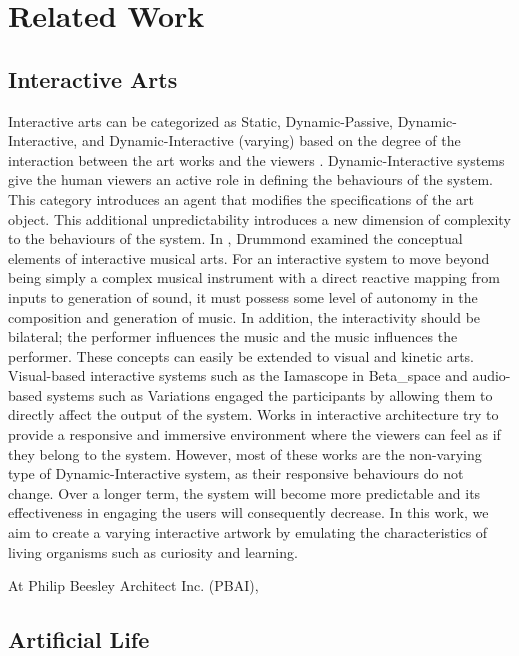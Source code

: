 \chapter{Related Work} \label{chap:related_work}

\section{Interactive Arts}
Interactive arts can be categorized as Static, Dynamic-Passive, Dynamic-Interactive, and Dynamic-Interactive (varying) based on the degree of the interaction between the art works and the viewers \cite{Edmonds2004}. Dynamic-Interactive systems give the human viewers an active role in defining the behaviours of the system. This category introduces an agent that modifies the specifications of the art object. This additional unpredictability introduces a new dimension of complexity to the behaviours of the system. 
In \cite{Drummond2009}, Drummond examined the conceptual elements of interactive musical arts. For an interactive system to move beyond being simply a complex musical instrument with a direct reactive mapping from inputs to generation of sound, it must possess some level of autonomy in the composition and generation of music. In addition, the interactivity should be bilateral; the performer influences the music and the music influences the performer. These concepts can easily be extended to visual and kinetic arts. Visual-based interactive systems such as the Iamascope in Beta\_space \cite{Costello2005} and audio-based systems such as Variations \cite{Wands2005} engaged the participants by allowing them to directly affect the output of the system. Works in interactive architecture \cite{Beesley2010}\cite{Hangar.org} try to provide a responsive and immersive environment where the viewers can feel as if they belong to the system. 
However, most of these works are the non-varying type of Dynamic-Interactive system, as their responsive behaviours do not change. Over a longer term, the system will become more predictable and its effectiveness in engaging the users will consequently decrease. In this work, we aim to create a varying interactive artwork by emulating the characteristics of living organisms such as curiosity and learning. 

At Philip Beesley Architect Inc. (PBAI), 



\section{Artificial Life}

